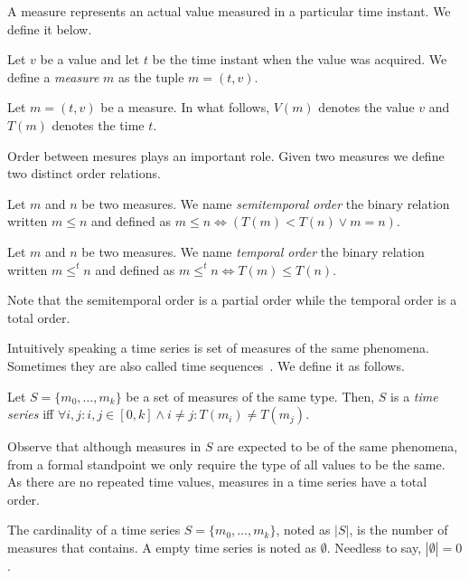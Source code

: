 A measure represents an actual value measured in a particular time
instant. We define it below.
\begin{definition}
  Let $v$ be a value and let $t$ be the time instant when the value
  was acquired. We define a \emph{measure} $m$ as the tuple $m=(t,v)$.
\end{definition}

Let $m = (t,v)$ be a measure. In what follows, $V(m)$ denotes the
value $v$ and $T(m)$ denotes the time $t$.

Order between mesures plays an important role. Given two measures we
define two distinct order relations.
%

\begin{definition}
  Let $m$ and $n$ be two measures. We name \emph{semitemporal order}
  the binary relation written $m\leq n$ and defined as $m\leq n\iff
  (T(m)<T(n) \vee m=n)$.
\end{definition}

\begin{definition} Let $m$ and $n$ be two measures. We
    name \emph{temporal order} the binary relation written $m \leq^t
    n$ and defined as $m \leq^t n \iff T(m) \leq T(n)$.
\end{definition}

Note that the semitemporal order is a partial order while the temporal
order is a total order.

Intuitively speaking a time series is set of measures of the same
phenomena.  Sometimes they are also called time
sequences~\cite{last:hetland}. We define it as follows.

\begin{definition}
  \label{def:model:timeseries}
  Let $S = \{m_0,\ldots,m_k\}$ be a set of measures of the same
  type. Then, $S$ is a \emph{time series} iff $\forall i,j:
  i,j\in[0,k] \wedge i\neq j: T(m_i)\neq T(m_j)$.
\end{definition}

Observe that although measures in $S$ are expected to be of the same
phenomena, from a formal standpoint we only require the type of all
values to be the same.
As there are no repeated time values, measures in a time series have a
total order.

The cardinality of a time series $S=\{m_0,\dots,m_k\}$, noted as
$|S|$, is the number of measures that contains.  A empty time series is
noted as $\emptyset$. Needless to say, $|\emptyset|=0$.


